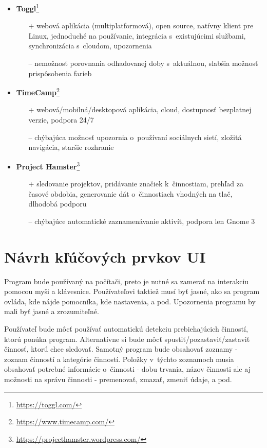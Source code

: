 \documentclass[]{article}
\begin{document}
\begin{itemize}
	\item \textbf{Toggl}\footnote{\url{https://toggl.com/}}
	\begin{itemize}
		\item[+] webová aplikácia (multiplatformová), open source, natívny klient pre Linux, jednoduché na používanie, integrácia s~existujúcimi službami, synchronizácia s~cloudom, upozornenia
		\item[--] nemožnosť porovnania odhadovanej doby s~aktuálnou, slabšia možnosť prispôsobenia farieb
	\end{itemize}
	
	\item \textbf{TimeCamp}\footnote{\url{https://www.timecamp.com/}}
	\begin{itemize}
		\item[+] webová/mobilná/desktopová aplikácia, cloud, dostupnosť bezplatnej verzie, podpora 24/7
		\item[--] chýbajúca možnosť upozornia o~používaní sociálnych sietí, zložitá navigácia, staršie rozhranie
	\end{itemize}
	
	\item \textbf{Project Hamster}\footnote{\url{https://projecthamster.wordpress.com/}}
	\begin{itemize}
		\item[+] sledovanie projektov, pridávanie značiek k~činnostiam, prehľad za časové obdobia, generovanie dát o~činnostiach vhodných na tlač, dlhodobá podporu
		\item[--] chýbajúce automatické zaznamenávanie aktivít, podpora len Gnome 3
	\end{itemize}

\end{itemize}

\newpage

\section{Návrh kľúčových prvkov UI}
Program bude používaný na počítači, preto je nutné sa zamerať na interakciu pomocou myši a klávesnice. Používateľovi taktiež musí byť jasné, ako sa program ovláda, kde nájde pomocníka, kde nastavenia, a pod. Upozornenia programu by mali byť jasné a zrozumiteľné.

Používateľ bude môcť používať automatickú detekciu prebiehajúcich činností, ktorú ponúka program. Alternatívne si bude môcť spustiť/pozastaviť/zastaviť činnosť, ktorú chce sledovať.
Samotný program bude obsahovať zoznamy - zoznam činností a kategórie činností. Položky v~týchto zoznamoch musia obsahovať potrebné informácie o~činnosti - dobu trvania, názov činnosti ale aj možnosti na správu činnosti - premenovať, zmazať, zmeniť údaje, a pod. 
\end{document}
